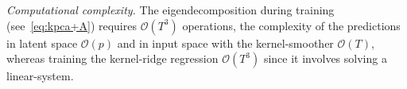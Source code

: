 \emph{Computational complexity.} The eigendecomposition during training (see~\eqref{eq:kpca+A}) requires $\mathcal{O}(T^{3})$ operations, the complexity of the predictions in latent space $\mathcal{O}(p)$ and in input space with the kernel-smoother $\mathcal{O}(T)$, whereas training the kernel-ridge regression $\mathcal{O}(T^{3})$ since it involves solving a linear-system.

%

